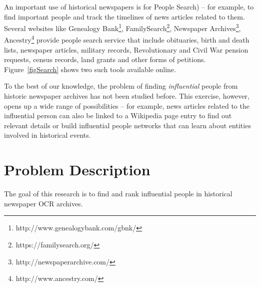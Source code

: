 An important use of historical newspapers is for People Search\cite{BilenkoMCRF03,Friedman_92}) -- for example, to find important people and track the timelines of news articles related to them. Several websites like Genealogy Bank\footnote{http://www.genealogybank.com/gbnk/}, FamilySearch\footnote{https://familysearch.org/}, Newspaper Archives\footnote{http://newspaperarchive.com/}, Ancestry\footnote{http://www.ancestry.com/} provide people search service that include obituaries, birth and death lists, newspaper articles, military records, Revolutionary and Civil War pension requests, census records, land grants and other forms of petitions. Figure~\ref{figSearch} shows two such tools available online.



  
To the best of our knowledge, the problem of finding \emph{influential} people from historic newspaper archives has not been studied before. This exercise, however, opens up a wide range of possibilities -- for example, news articles related to the influential person can also be linked to a Wikipedia page entry to find out relevant details or build influential people networks that can learn about entities involved in historical events. 

\section{Problem Description}
\label{problem}


The goal of this research is to find and rank influential people in historical newspaper OCR archives.



